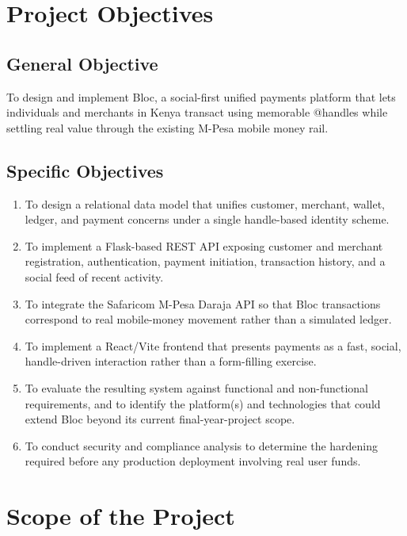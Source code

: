 \documentclass[12pt, a4paper, twoside, openright]{report}
\begin{document}
\section{Project Objectives}

\subsection{General Objective}

To design and implement Bloc, a social-first unified payments platform that lets individuals and merchants in Kenya transact using memorable @handles while settling real value through the existing M-Pesa mobile money rail.

\subsection{Specific Objectives}

\begin{enumerate}
    \item To design a relational data model that unifies customer, merchant, wallet, ledger, and payment concerns under a single handle-based identity scheme.
    
    \item To implement a Flask-based REST API exposing customer and merchant registration, authentication, payment initiation, transaction history, and a social feed of recent activity.
    
    \item To integrate the Safaricom M-Pesa Daraja API so that Bloc transactions correspond to real mobile-money movement rather than a simulated ledger.
    
    \item To implement a React/Vite frontend that presents payments as a fast, social, handle-driven interaction rather than a form-filling exercise.
    
    \item To evaluate the resulting system against functional and non-functional requirements, and to identify the platform(s) and technologies that could extend Bloc beyond its current final-year-project scope.
    
    \item To conduct security and compliance analysis to determine the hardening required before any production deployment involving real user funds.
\end{enumerate}

\section{Scope of the Project}
\end{document}
